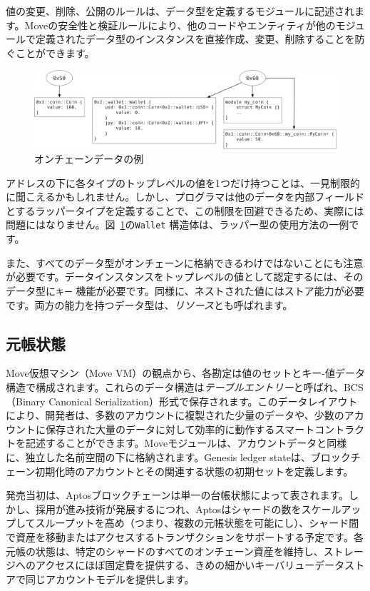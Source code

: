 \documentclass{article}
\begin{document}
値の変更、削除、公開のルールは、データ型を定義するモジュールに記述されます。Moveの安全性と検証ルールにより、他のコードやエンティティが他のモジュールで定義されたデータ型のインスタンスを直接作成、変更、削除することを防ぐことができます。

\begin{figure}
\centering
\includegraphics[width=1.0\textwidth]{move_2.pdf}
\caption{\label{fig:move_data}オンチェーンデータの例}
\end{figure}

アドレスの下に各タイプのトップレベルの値を1つだけ持つことは、一見制限的に聞こえるかもしれません。しかし、プログラマは他のデータを内部フィールドとするラッパータイプを定義することで、この制限を回避できるため、実際には問題にはなりません。図~\ref{fig:move_data}の\texttt{Wallet} 構造体は、ラッパー型の使用方法の一例です。

また、すべてのデータ型がオンチェーンに格納できるわけではないことにも注意が必要です。データインスタンスをトップレベルの値として認定するには、そのデータ型に\texttt{キー} 機能が必要です。同様に、ネストされた値にはストア能力が必要です。両方の能力を持つデータ型は、\emph{リソース}とも呼ばれます。

\subsection{元帳状態}
\label{sub:ledger_state}

Move仮想マシン（Move VM）の観点から、各勘定は値のセットとキー-値データ構造で構成されます。これらのデータ構造は\emph{テーブルエントリー}と呼ばれ、BCS（Binary Canonical Serialization）形式で保存されます。このデータレイアウトにより、開発者は、多数のアカウントに複製された少量のデータや、少数のアカウントに保存された大量のデータに対して効率的に動作するスマートコントラクトを記述することができます。Moveモジュールは、アカウントデータと同様に、独立した名前空間の下に格納されます。Genesis ledger stateは、ブロックチェーン初期化時のアカウントとその関連する状態の初期セットを定義します。

発売当初は、Aptosブロックチェーンは単一の台帳状態によって表されます。しかし、採用が進み技術が発展するにつれ、Aptosはシャードの数をスケールアップしてスループットを高め（つまり、複数の元帳状態を可能にし）、シャード間で資産を移動またはアクセスするトランザクションをサポートする予定です。各元帳の状態は、特定のシャードのすべてのオンチェーン資産を維持し、ストレージへのアクセスにほぼ固定費を提供する、きめの細かいキーバリューデータストアで同じアカウントモデルを提供します。
\end{document}
